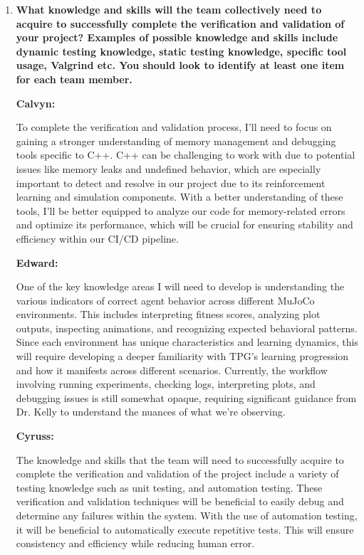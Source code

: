 \documentclass[12pt, titlepage]{article}
\begin{document}
\begin{enumerate}
  \item \textbf{What knowledge and skills will the team collectively need to acquire to
  successfully complete the verification and validation of your project?
  Examples of possible knowledge and skills include dynamic testing knowledge,
  static testing knowledge, specific tool usage, Valgrind etc.  You should look to
  identify at least one item for each team member.}

    \newline
    \newline


    \textbf{Calvyn:}
    
     To complete the verification and validation process,  I’ll need to focus on gaining a stronger understanding of memory management and debugging tools specific to C++. C++ can be challenging to work with due to potential issues like memory leaks and undefined behavior, which are especially important to detect and resolve in our project due to its reinforcement learning and simulation components. With a better understanding of these tools, I’ll be better equipped to analyze our code for memory-related errors and optimize its performance, which will be crucial for ensuring stability and efficiency within our CI/CD pipeline.

    

    \textbf{Edward:}
    
     One of the key knowledge areas I will need to develop is understanding the various indicators of correct agent behavior across different MuJoCo environments. This includes interpreting fitness scores, analyzing plot outputs, inspecting animations, and recognizing expected behavioral patterns. Since each environment has unique characteristics and learning dynamics, this will require developing a deeper familiarity with TPG's learning progression and how it manifests across different scenarios. Currently, the workflow involving running experiments, checking logs, interpreting plots, and debugging issues is still somewhat opaque, requiring significant guidance from Dr. Kelly to understand the nuances of what we're observing.

    

    \textbf{Cyruss:}
    
     The knowledge and skills that the team will need to successfully acquire to complete the verification and validation of the project include a variety of testing knowledge such as unit testing, and automation testing. These verification and validation techniques will be beneficial to easily debug and determine any failures within the system. With the use of automation testing, it will be beneficial to automatically execute repetitive tests. This will ensure consistency and efficiency while reducing human error.



\end{enumerate}
\end{document}

